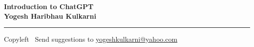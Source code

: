 
\graphicspath{{images/}}

\footnotesize


\begin{center}
\Large{\textbf{Introduction to ChatGPT\\ Yogesh Haribhau Kulkarni}}  
\end{center}

\begin{multicols}{2}
	
\end{multicols}

\rule{\linewidth}{0.25pt}
\scriptsize
Copyleft \textcopyleft\  Send suggestions to 
\href{http://www.yogeshkulkarni.com}{yogeshkulkarni@yahoo.com}


